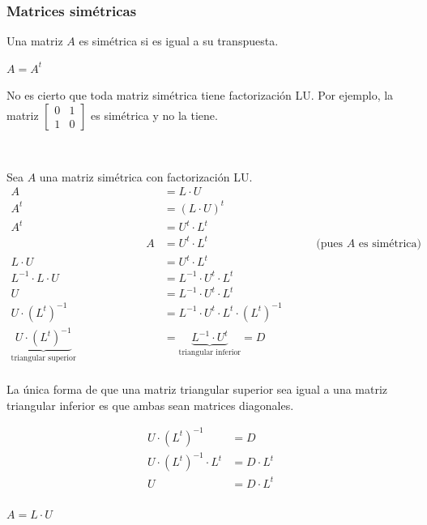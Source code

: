 \documentclass[]{article}
\begin{document}
\subsubsection{Matrices simétricas}
\begin{defi} Una matriz $A$ es simétrica si es igual a su transpuesta.
	\begin{center}
		$A = A^t$
	\end{center}
\end{defi}

No es cierto que toda matriz simétrica tiene factorización LU. Por ejemplo, la matriz $\begin{bmatrix}0 & 1 \\ 1 & 0\end{bmatrix}$ es simétrica y no la tiene.

~\newline

Sea $A$ una matriz simétrica con factorización LU.
\begin{align*}
	A &= L\cdot U\\
	A^t &= (L\cdot U)^t\\
	A^t &= U^t\cdot L^t\\
	\hspace{5cm} A &= U^t\cdot L^t \hspace{4cm} \text{(pues $A$ es simétrica)}\\
	L\cdot U &= U^t\cdot L^t\\
	L^{-1}\cdot L\cdot U &= L^{-1} \cdot U^t\cdot L^t\\
	U &= L^{-1} \cdot U^t\cdot L^t\\
	U \cdot (L^t)^{-1}&= L^{-1} \cdot U^t\cdot L^t \cdot (L^t)^{-1}\\
	\underbrace{U \cdot (L^t)^{-1}}_{\text{triangular superior}} &= \underbrace{L^{-1} \cdot U^t}_{\text{triangular inferior}} = D\\
\end{align*}

La única forma de que una matriz triangular superior sea igual a una matriz triangular inferior es que ambas sean matrices diagonales.

\begin{align*}
	U\cdot (L^t)^{-1} &= D\\
	U\cdot (L^t)^{-1} \cdot L^t &= D\cdot L^t\\
	U &= D\cdot L^t\\
\end{align*}

\begin{center}
	$A = L\cdot U$
\end{center}
\end{document}
